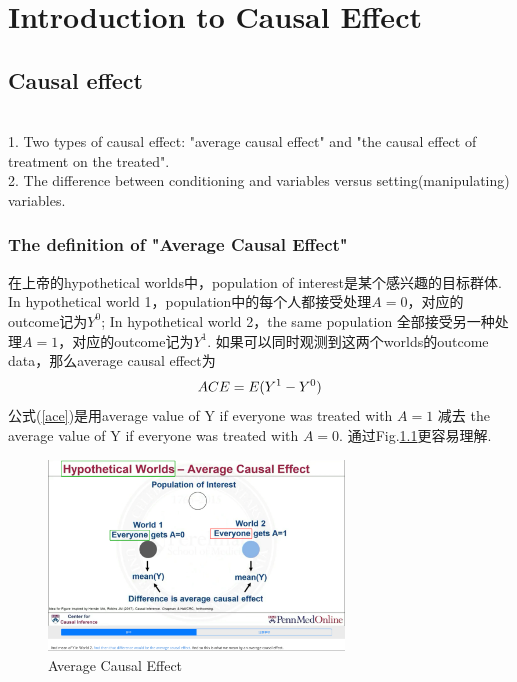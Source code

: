 \chapter{Introduction to Causal Effect}

\section{Causal effect}
\\
1. Two types of causal effect: "average causal effect" and 
"the causal effect of treatment on the treated".\\
2. The difference between conditioning and variables versus setting(manipulating) variables.
\subsection{The definition of "Average Causal Effect"}
在上帝的hypothetical worlds中，population of interest是某个感兴趣的目标群体. In hypothetical world 1，population中的每个人都接受处理$A=0$，对应的outcome记为$Y^0$;  In hypothetical world 2，the same population 全部接受另一种处理$A=1$，对应的outcome记为$Y^1$. 如果可以同时观测到这两个worlds的outcome data，那么average causal effect为
\begin{equation}
\setlength{\abovedisplayskip}{3pt}
\setlength{\belowdisplayskip}{3pt}
\label{ace}
ACE=E(Y^1 -Y^0)
\end{equation}
公式(\ref{ace})是用average value of Y if everyone was treated with $A=1$ 减去 the average value of Y if everyone was treated with $A=0$. 通过Fig.\ref{ACE}更容易理解.
\begin{figure}[htbp]
	\setlength{\abovecaptionskip}{0pt}     %
	\setlength{\belowcaptionskip}{0pt}
	\vspace{-0cm}  %
	\setlength{\abovecaptionskip}{-0cm}   %
	\setlength{\belowcaptionskip}{0cm}   %
	\centering
	\includegraphics[width=0.7\textwidth]{figure/ACE.png}
	\caption{Average Causal Effect}
	\label{ACE}
\end{figure}

